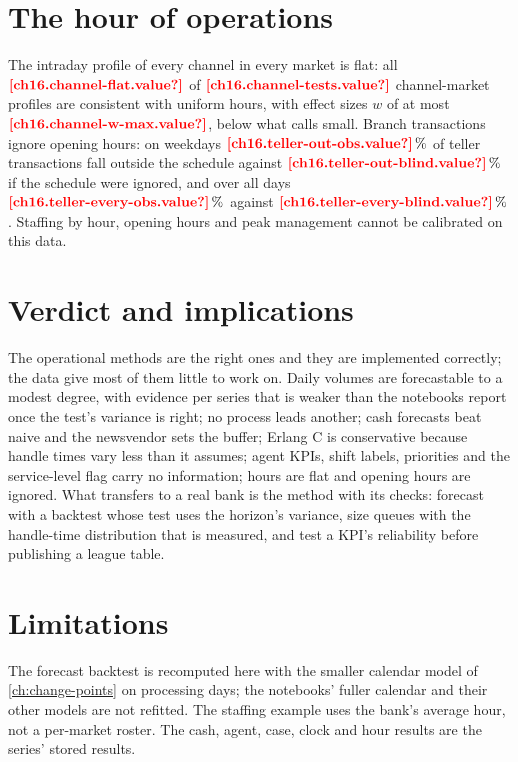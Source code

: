 \section{The hour of operations}\label{sec:op-hours}

The intraday profile of every channel in every market is flat: all $\est{ch16.channel-flat}{value}$ of
$\est{ch16.channel-tests}{value}$ channel-market profiles are consistent with uniform hours, with effect sizes $w$ of at most
$\est{ch16.channel-w-max}{value}$, below what \textcite{cohen1988} calls small. Branch transactions ignore opening hours: on
weekdays $\est{ch16.teller-out-obs}{value}\,\%$ of teller transactions fall outside the schedule against
$\est{ch16.teller-out-blind}{value}\,\%$ if the schedule were ignored, and over all days $\est{ch16.teller-every-obs}{value}\,\%$
against $\est{ch16.teller-every-blind}{value}\,\%$. Staffing by hour, opening hours and peak management cannot be calibrated on
this data.

\section{Verdict and implications}\label{sec:op-verdict}

The operational methods are the right ones and they are implemented correctly; the data give most of them little to work on.
Daily volumes are forecastable to a modest degree, with evidence per series that is weaker than the notebooks report once the
test's variance is right; no process leads another; cash forecasts beat naive and the newsvendor sets the buffer; Erlang C is
conservative because handle times vary less than it assumes; agent KPIs, shift labels, priorities and the service-level flag
carry no information; hours are flat and opening hours are ignored. What transfers to a real bank is the method with its
checks: forecast with a backtest whose test uses the horizon's variance, size queues with the handle-time distribution that is
measured, and test a KPI's reliability before publishing a league table.

\section{Limitations}\label{sec:op-limits}

The forecast backtest is recomputed here with the smaller calendar model of \cref{ch:change-points} on processing days; the
notebooks' fuller calendar and their other models are not refitted. The staffing example uses the bank's average hour, not a
per-market roster. The cash, agent, case, clock and hour results are the series' stored results.
